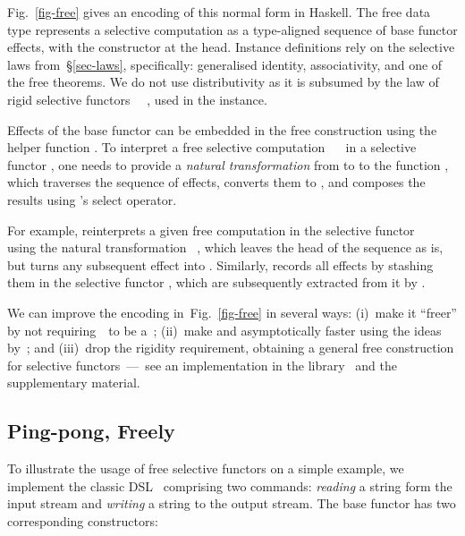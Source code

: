 Fig.~\ref{fig-free} gives an encoding of this normal form in Haskell. The free
data type  represents a selective computation as a type-aligned
sequence of base functor effects, with the  constructor at the head.
Instance definitions rely on the selective laws from~\S\ref{sec-laws},
specifically: generalised identity, associativity, and one of the free theorems.
We do not use distributivity as it is subsumed by the law of rigid selective
functors \hs{(<*>)}~\hs{=}~, used in the  instance.

Effects of the base functor can be embedded in the free construction using
the helper function . To interpret a free selective computation
~~ in a selective functor , one needs to provide
a \emph{natural transformation} from  to  to the function
, which traverses the sequence of effects, converts them to
, and composes the results using 's select operator.

For example,  reinterprets a given free computation in the selective
functor ~\hs{=}~ using the natural transformation
~, which leaves the  head of the sequence as is,
but turns any subsequent effect into . Similarly, 
records all effects by stashing them in the selective functor , which
are subsequently extracted from it by .

We can improve the encoding in~Fig.~\ref{fig-free} in several ways: (i)~make it
``freer'' by not requiring~~to be a~; (ii)~make  and
 asymptotically faster using the ideas
by~\citet{menendez2013free}; and (iii)~drop the rigidity requirement,
obtaining a general free construction for selective functors~---~see an
implementation in the library~\citep{selective2019haskell} and the supplementary
material.

\subsection{Ping-pong, Freely}\label{sec-free-ping-pong}

To illustrate the usage of free selective functors on a simple example, we
implement the classic  DSL~\cite{swierstra2008data} comprising
two commands: \emph{reading} a string form the input stream and \emph{writing}
a string to the output stream. The base functor has two corresponding
constructors:

